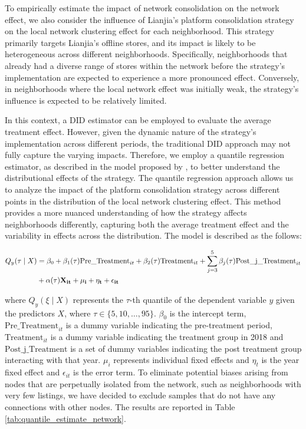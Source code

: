 \documentclass[11pt]{article}
\begin{document}
To empirically estimate the impact of network consolidation on the network effect, we also consider the influence of Lianjia's platform consolidation strategy on the local network clustering effect for each neighborhood. This strategy primarily targets Lianjia's offline stores, and its impact is likely to be heterogeneous across different neighborhoods. Specifically, neighborhoods that already had a diverse range of stores within the network before the strategy's implementation are expected to experience a more pronounced effect. Conversely, in neighborhoods where the local network effect was initially weak, the strategy's influence is expected to be relatively limited. 

In this context, a DID estimator can be employed to evaluate the average treatment effect. However, given the dynamic nature of the strategy's implementation across different periods, the traditional DID approach may not fully capture the varying impacts. Therefore, we employ a quantile regression estimator, as described in the model proposed by \citep{machado_quantiles_2019}, to better understand the distributional effects of the strategy. The quantile regression approach allows us to analyze the impact of the platform consolidation strategy across different points in the distribution of the local network clustering effect. This method provides a more nuanced understanding of how the strategy affects neighborhoods differently, capturing both the average treatment effect and the variability in effects across the distribution. The model is described as the follows:

\begin{equation}
  \begin{aligned}
    Q_y(\tau \mid X) & = \beta_0 + \beta_1(\tau) \text{Pre\_Treatment}_{it} + \beta_2(\tau) \text{Treatment}_{it} + \sum_{j=3}^5 \beta_j(\tau) \text{Post\_j\_Treatment}_{it} \\
                     & + \alpha(\tau) \bf{X}_{it} + \mu_i + \eta_t + \epsilon_{it}
  \end{aligned}
\end{equation}

where $Q_y(\xi \mid X)$ represents the $\tau$-th quantile of the dependent variable $y$ given the predictors $X$, where $\tau \in \{5, 10, \ldots, 95\}$. $\beta_0$ is the intercept term, $\text{Pre\_Treatment}_{it}$ is a dummy variable indicating the pre-treatment period, $\text{Treatment}_{it}$ is a dummy variable indicating the treatment group in 2018 and $\text{Post\_j\_Treatment}$ is a set of dummy variables indicating the post treatment group interacting with that year. $\mu_i$ represents individual fixed effects and $\eta_t$ is the year fixed effect and $\epsilon_{it}$ is the error term. To eliminate potential biases arising from nodes that are perpetually isolated from the network, such as neighborhoods with very few listings, we have decided to exclude samples that do not have any connections with other nodes. The results are reported in Table \ref{tab:quantile_estimate_network}. 
\end{document}
